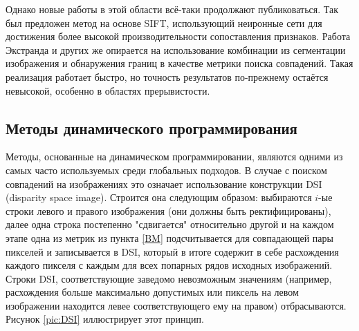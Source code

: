 Однако новые работы в этой области всё-таки продолжают публиковаться. Так был предложен метод на основе SIFT, использующий неиронные сети для 	
достижения более высокой производительности \cite{modsift} сопоставления признаков.   Работа Экстранда и других \cite{ekstrand2015high} же опирается на 
использование комбинации из сегментации изображения и обнаружения границ в качестве метрики поиска совпадений. Такая реализация работает быстро, но точность 
результатов по-прежнему остаётся невысокой, особенно в областях прерывистости. %

\subsection{Методы динамического программирования}
Методы, основанные на динамическом программировании, являются одними из самых часто используемых среди глобальных подходов.  
В случае с поиском совпадений на изображениях это означает использование конструкции DSI (disparity space image). Строится она следующим образом: 
выбираются $i$-ые строки левого и правого изображения (они должны быть ректифицированы), далее одна строка постепенно "сдвигается" относительно другой и
на каждом этапе одна из метрик из пункта \ref{BM} подсчитывается для совпадающей пары пикселей и записывается в DSI, который в итоге содержит в себе расхождения каждого пикселя 
с каждым для всех попарных рядов исходных изображений. Строки DSI, соответствующие заведомо невозможным значениям (например, расхождения больше максимально допустимых или пиксель на 
левом изображении находится левее соответствующего ему на правом) отбрасываются. 
Рисунок \ref{pic:DSI} \cite{DSI} иллюстрирует этот принцип. 
